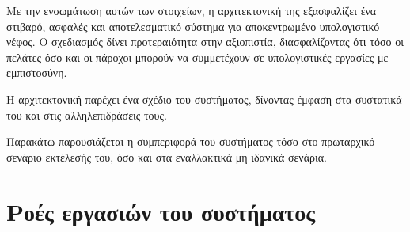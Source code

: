 Με την ενσωμάτωση αυτών των στοιχείων, η αρχιτεκτονική της  εξασφαλίζει ένα στιβαρό, ασφαλές και αποτελεσματικό σύστημα για αποκεντρωμένο υπολογιστικό νέφος. Ο σχεδιασμός δίνει προτεραιότητα στην αξιοπιστία, διασφαλίζοντας ότι τόσο οι πελάτες όσο και οι πάροχοι μπορούν να συμμετέχουν σε υπολογιστικές εργασίες με εμπιστοσύνη.

Η αρχιτεκτονική παρέχει ένα σχέδιο του συστήματος, δίνοντας έμφαση στα συστατικά του 
και στις αλληλεπιδράσεις τους. 

Παρακάτω παρουσιάζεται η συμπεριφορά του συστήματος τόσο στο πρωταρχικό σενάριο εκτέλεσής του, όσο και στα εναλλακτικά μη ιδανικά σενάρια.

\section{Ροές εργασιών του συστήματος}
